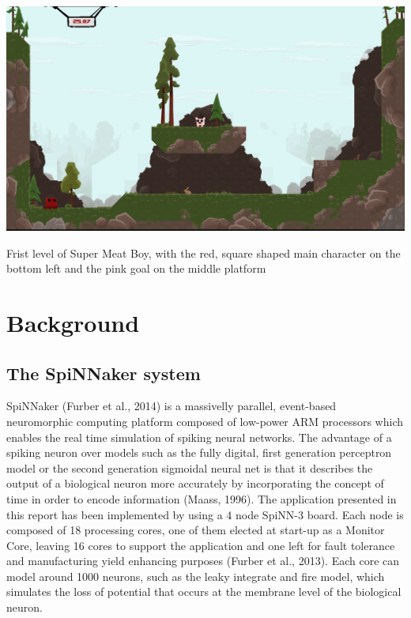 \documentclass[10pt]{article}
\begin{document}
    \begin{suppfigure*}[b]
    \center
    \includegraphics[width=160mm]{./level1.png}
    \caption{Frist level of Super Meat Boy, with the red, square shaped main character on the bottom left and the pink goal on the middle platform}
    \label{fig:firstLevel}
    \end{suppfigure*}


    \section{Background}

    \subsection{The SpiNNaker system}

    SpiNNaker (Furber et al., 2014) is a massivelly parallel, event-based neuromorphic computing platform composed of low-power ARM processors which enables the real time simulation of spiking neural networks. The advantage of a spiking neuron over models such as the fully digital, first generation perceptron model or the second generation sigmoidal neural net is that it describes the output of a biological neuron more accurately by incorporating the concept of time in order to encode information (Maass, 1996). The application presented in this report has been implemented by using a 4 node SpiNN-3 board. Each node is composed of 18 processing cores, one of them elected at start-up as a Monitor Core, leaving 16 cores to support the application and one left for fault tolerance and manufacturing yield enhancing purposes (Furber et al., 2013). Each core can model around 1000 neurons, such as the leaky integrate and fire model, which simulates the loss of potential that occurs at the membrane level of the biological neuron.
\end{document}
